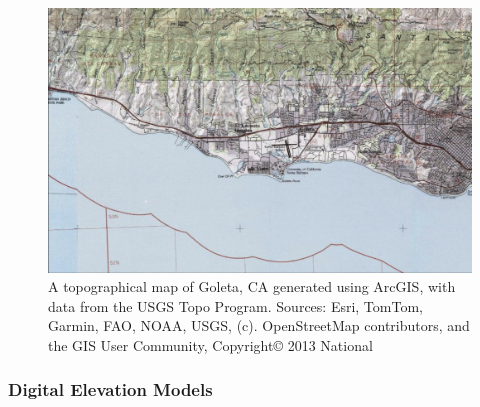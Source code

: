 \documentclass{article}
\begin{document}
\begin{figure}
    \centering
    \includegraphics[width=1.0\linewidth]{images/us-topo-goleta.png}
    \caption{A topographical map of Goleta, CA generated using ArcGIS, with data from the USGS Topo Program. Sources: Esri, TomTom, Garmin, FAO, NOAA, USGS, (c). OpenStreetMap contributors, and the GIS User Community, Copyright© 2013 National}
    \label{figure29}
\end{figure}


\subsubsection{Digital Elevation Models}
\end{document}
